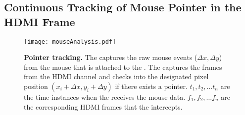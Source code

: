 %
%

\subsection{Continuous Tracking of Mouse Pointer in the HDMI Frame}
\label{sec:systemDesign:analysis}


\begin{figure}[t]
\centering
\texttt{[image: mouseAnalysis.pdf]}
\caption{\textbf{Pointer tracking.} \one The \device captures the raw mouse events ($\Delta x, \Delta y$) from the mouse that is attached to the \device. \two The \device captures the frames from the HDMI channel and checks into the designated pixel position $(x_i + \Delta x, y_i + \Delta y)$ if there exists a pointer. $t_1, t_2,\ldots t_n$ are the time instances when the \device receives the mouse data. $f_1, f_2,\ldots f_n$ are the corresponding HDMI frames that the \device intercepts.}
\spacesave
\label{fig:mouseAnalysis}
\centering
\end{figure}

